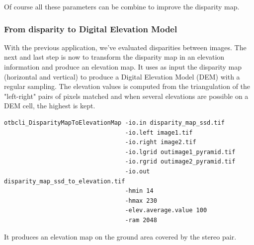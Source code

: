 Of course all these parameters can be combine to improve the disparity map.

\subsubsection{From disparity to Digital Elevation Model}

With the previous application, we've evaluated disparities between images. The
next and last step is now to transform the disparity map in an elevation
information and produce an elevation map.  It uses as input the disparity map
(horizontal and vertical) to produce a Digital Elevation Model (DEM) with a
regular sampling. The elevation values is computed from the triangulation of the
"left-right" pairs of pixels matched and when several elevations are possible on
a DEM cell, the highest is kept.

\begin{verbatim}
otbcli_DisparityMapToElevationMap -io.in disparity_map_ssd.tif
                                  -io.left image1.tif
                                  -io.right image2.tif
                                  -io.lgrid outimage1_pyramid.tif
                                  -io.rgrid outimage2_pyramid.tif
                                  -io.out disparity_map_ssd_to_elevation.tif
                                  -hmin 14
                                  -hmax 230
                                  -elev.average.value 100
                                  -ram 2048
\end{verbatim}

It produces an elevation map on the ground area covered by the stereo pair.
